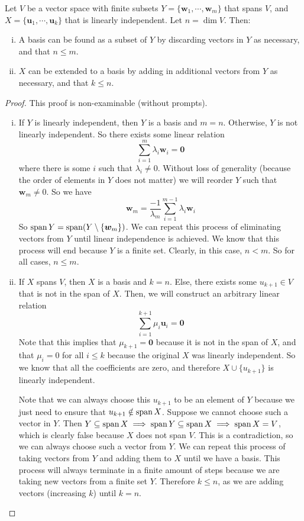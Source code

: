 \documentclass{article}
\begin{document}
\begin{proposition}
	Let $V$ be a vector space with finite subsets $Y = \{ \bm w_1, \cdots, \bm w_m \}$ that spans $V$, and $X = \{ \bm u_1, \cdots, \bm u_k \}$ that is linearly independent. Let $n = \dim V$. Then:
	\begin{enumerate}[(i)]
		\item A basis can be found as a subset of $Y$ by discarding vectors in $Y$ as necessary, and that $n \leq m$.
		\item $X$ can be extended to a basis by adding in additional vectors from $Y$ as necessary, and that $k \leq n$.
	\end{enumerate}
\end{proposition}
\begin{proof}
	This proof is non-examinable (without prompts).
	\begin{enumerate}[(i)]
		\item If $Y$ is linearly independent, then $Y$ is a basis and $m = n$. Otherwise, $Y$ is not linearly independent. So there exists some linear relation
		      \[ \sum_{i=1}^{m} \lambda_i \bm w_i = \bm 0 \]
		      where there is some $i$ such that $\lambda_i \neq 0$. Without loss of generality (because the order of elements in $Y$ does not matter) we will reorder $Y$ such that $\bm w_m \neq 0$. So we have
		      \[ \bm w_m = \frac{-1}{\lambda_m} \sum_{i=1}^{m-1} \lambda_i \bm w_i \]
		      So $\operatorname{span} Y = \operatorname{span} (Y \setminus \{ \bm w_m \})$. We can repeat this process of eliminating vectors from $Y$ until linear independence is achieved. We know that this process will end because $Y$ is a finite set. Clearly, in this case, $n < m$. So for all cases, $n \leq m$.

		\item If $X$ spans $V$, then $X$ is a basis and $k=n$. Else, there exists some $u_{k+1} \in V$ that is not in the span of $X$. Then, we will construct an arbitrary linear relation
		      \[ \sum_{i=1}^{k+1} \mu_i \bm u_i = \bm 0 \]
		      Note that this implies that $\mu_{k+1} = \bm 0$ because it is not in the span of $X$, and that $\mu_i = 0$ for all $i \leq k$ because the original $X$ was linearly independent. So we know that all the coefficients are zero, and therefore $X \cup \{ u_{k+1} \}$ is linearly independent.

		      Note that we can always choose this $u_{k+1}$ to be an element of $Y$ because we just need to ensure that $u_{k+1} \notin \operatorname{span} X$. Suppose we cannot choose such a vector in $Y$. Then $Y \subseteq \operatorname{span} X \implies \operatorname{span} Y \subseteq \operatorname{span} X \implies \operatorname{span} X = V$, which is clearly false because $X$ does not span $V$. This is a contradiction, so we can always choose such a vector from $Y$. We can repeat this process of taking vectors from $Y$ and adding them to $X$ until we have a basis. This process will always terminate in a finite amount of steps because we are taking new vectors from a finite set $Y$. Therefore $k \leq n$, as we are adding vectors (increasing $k$) until $k=n$.
	\end{enumerate}
\end{proof}
\end{document}
